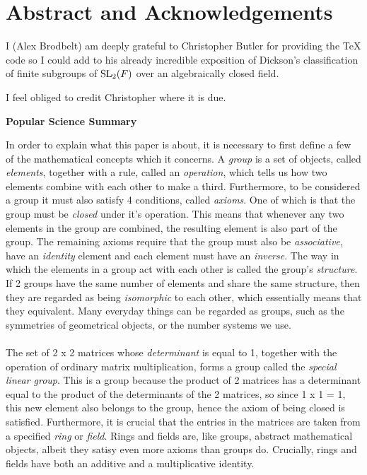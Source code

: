 \chapter{Abstract and Acknowledgements}

I (Alex Brodbelt) am deeply grateful to Christopher Butler for providing the TeX code so I could add to his 
already incredible exposition of Dickson's classification of finite subgroups of $\operatorname{SL}_2(F)$ over an algebraically closed field.

I feel obliged to credit Christopher where it is due.


\begin{center}
    \Large \textbf{Popular Science Summary}
\end{center}

In order to explain what this paper is about, it is necessary to first define a few of the mathematical concepts which it concerns. A \textit{group} is a set of objects, called \textit{elements}, together with a rule, called an \textit{operation}, which tells us how two elements combine with each other to make a third. Furthermore, to be considered a group it must also satisfy 4 conditions, called \textit{axioms}. One of which is that the group must be \textit{closed} under it's operation. This means that whenever any two elements in the group are combined, the resulting element is also part of the group. The remaining axioms require that the group must also be \textit{associative}, have an \textit{identity} element and each element must have an \textit{inverse}. The way in which the elements in a group act with each other is called the group's \textit{structure}. If 2 groups have the same number of elements and share the same structure, then they are regarded as being \textit{isomorphic} to each other, which essentially means that they equivalent. Many everyday things can be regarded as groups, such as the symmetries of geometrical objects, or the number systems we use. \\
\\
The set of 2 x 2 matrices whose \textit{determinant} is equal to 1, together with the operation of ordinary matrix multiplication, forms a group called the \textit{special linear group}. This is a group because the product of 2 matrices has a determinant equal to the product of the determinants of the 2 matrices, so since 1 x 1 = 1, this new element also belongs to the group, hence the axiom of being closed is satisfied. Furthermore, it is crucial that the entries in the matrices are taken from a specified \textit{ring} or \textit{field}. Rings and fields are, like groups, abstract mathematical objects, albeit they satisy even more axioms than groups do. Crucially, rings and fields have both an additive and a multiplicative identity. \\
